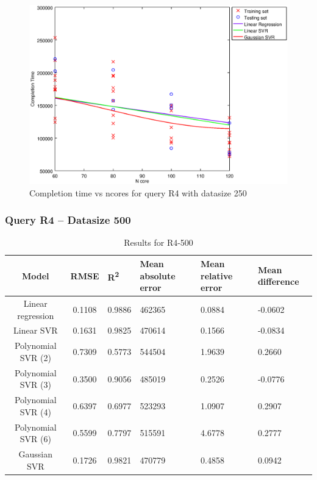 \documentclass[a4paper,11pt]{article}
\begin{document}
\begin {figure}[hbtp]
\centering
\includegraphics[width=\textwidth]{output/R4_250_LINEAR_NCORE/plot_R4_250_bestmodels.eps}
\caption{Completion time vs ncores for query R4 with datasize 250}
\label{fig:all_linear_R4_250}
\end {figure}

\newpage
\subsubsection{Query R4 -- Datasize 500}
\begin{table}[H]
	\centering
	\begin{adjustbox}{center}
		\begin{tabular}{c | c M{1.2cm} M{2.5cm} M{2.5cm} M{1.8cm}}
			Model & RMSE & R\textsuperscript{2} & Mean absolute error & Mean relative error & Mean difference \tabularnewline
			\hline
			Linear regression & 0.1108 & 0.9886 & 462365 & 0.0884 & -0.0602 \\
			Linear SVR & 0.1631 & 0.9825 & 470614 & 0.1566 & -0.0834 \\
			Polynomial SVR (2) & 0.7309 & 0.5773 & 544504 & 1.9639 & 0.2660 \\
			Polynomial SVR (3) & 0.3500 & 0.9056 & 485019 & 0.2526 & -0.0776 \\
			Polynomial SVR (4) & 0.6397 & 0.6977 & 523293 & 1.0907 & 0.2907 \\
			Polynomial SVR (6) & 0.5599 & 0.7797 & 515591 & 4.6778 & 0.2777 \\
			Gaussian SVR & 0.1726 & 0.9821 & 470779 & 0.4858 & 0.0942 \\
		\end{tabular}
	\end{adjustbox}
	\\
	\caption{Results for R4-500}
	\label{fig:all_linear_R4_500}
\end{table}
\end{document}
